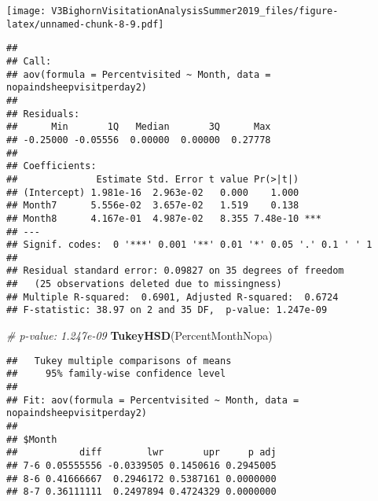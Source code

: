 \documentclass[]{article}
\newenvironment{Shaded}{\begin{snugshade}}{\end{snugshade}}
\newcommand{\CommentTok}[1]{\textcolor[rgb]{0.56,0.35,0.01}{\textit{#1}}}
\newcommand{\DataTypeTok}[1]{\textcolor[rgb]{0.13,0.29,0.53}{#1}}
\newcommand{\KeywordTok}[1]{\textcolor[rgb]{0.13,0.29,0.53}{\textbf{#1}}}
\newcommand{\NormalTok}[1]{#1}
\newcommand{\OperatorTok}[1]{\textcolor[rgb]{0.81,0.36,0.00}{\textbf{#1}}}
\newcommand{\StringTok}[1]{\textcolor[rgb]{0.31,0.60,0.02}{#1}}
\begin{document}
\texttt{[image: V3BighornVisitationAnalysisSummer2019\_files/figure-latex/unnamed-chunk-8-9.pdf]}

\begin{Shaded}
\end{Shaded}

\begin{verbatim}
## 
## Call:
## aov(formula = Percentvisited ~ Month, data = nopaindsheepvisitperday2)
## 
## Residuals:
##      Min       1Q   Median       3Q      Max 
## -0.25000 -0.05556  0.00000  0.00000  0.27778 
## 
## Coefficients:
##              Estimate Std. Error t value Pr(>|t|)    
## (Intercept) 1.981e-16  2.963e-02   0.000    1.000    
## Month7      5.556e-02  3.657e-02   1.519    0.138    
## Month8      4.167e-01  4.987e-02   8.355 7.48e-10 ***
## ---
## Signif. codes:  0 '***' 0.001 '**' 0.01 '*' 0.05 '.' 0.1 ' ' 1
## 
## Residual standard error: 0.09827 on 35 degrees of freedom
##   (25 observations deleted due to missingness)
## Multiple R-squared:  0.6901, Adjusted R-squared:  0.6724 
## F-statistic: 38.97 on 2 and 35 DF,  p-value: 1.247e-09
\end{verbatim}

\begin{Shaded}
\begin{Highlighting}[]
\CommentTok{# p-value: 1.247e-09}
\KeywordTok{TukeyHSD}\NormalTok{(PercentMonthNopa)}
\end{Highlighting}
\end{Shaded}

\begin{verbatim}
##   Tukey multiple comparisons of means
##     95% family-wise confidence level
## 
## Fit: aov(formula = Percentvisited ~ Month, data = nopaindsheepvisitperday2)
## 
## $Month
##           diff        lwr       upr     p adj
## 7-6 0.05555556 -0.0339505 0.1450616 0.2945005
## 8-6 0.41666667  0.2946172 0.5387161 0.0000000
## 8-7 0.36111111  0.2497894 0.4724329 0.0000000
\end{verbatim}
\end{document}

